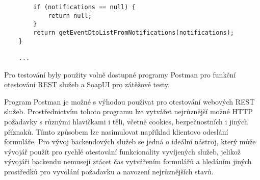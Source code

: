 \documentclass[twoside, 12pt]{article}
\begin{document}
{\begin{lstlisting}
        if (notifications == null) {
            return null;
        }
        return getEventDtoListFromNotifications(notifications);
    }

    ...

\end{lstlisting}


\clearpage


Pro testování byly použity volně dostupné programy Postman pro funkční otestování REST služeb
a SoapUI pro zátěžové testy.

Program Postman je možné s výhodou používat pro otestování webových REST služeb.
Prostřednictvím tohoto programu lze vytvářet nejrůznější možné HTTP požadavky
s různými hlavičkami i těli, včetně cookies, bezpečnostních i jiných příznaků.
Tímto způsobem lze nasimulovat například klientovo odeslání formuláře.
Pro vývoj backendových služeb se jedná o ideální nástroj,
který může vývojář použít pro rychlé otestování funkcionality
vyvíjených služeb, jelikož vývojáři backendu nemusejí ztácet čas vytvářením formulářů
a hledáním jiných prostředků pro vyvolání požadavku a navození nejrůznějších stavů.

\vspace{10}

}
\end{document}
